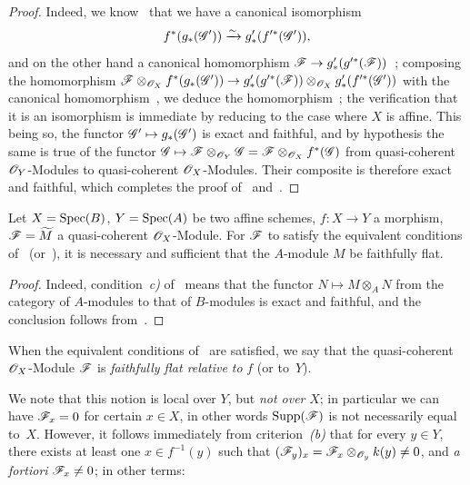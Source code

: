 \begin{proof}
Indeed, we know~ that we have a canonical isomorphism
\[
  f^*(g_*(\mathscr{G}'))\xrightarrow{\sim} g'_*(f'^*(\mathscr{G}')),
\]
and on the other hand a canonical homomorphism $\mathscr{F}\to g'_*(g'^*(\mathscr{F}))$~; composing the homomorphism $\mathscr{F}\otimes_{\mathscr{O}_X}f^*(g_*(\mathscr{G}'))\to g'_*(g'^*(\mathscr{F}))\otimes_{\mathscr{O}_X}g'_*(f'^*(\mathscr{G}'))$ with the canonical homomorphism~, we deduce the homomorphism~; the verification that it is an isomorphism is immediate by reducing to the case where $X$ is affine.
This being so, the functor $\mathscr{G}'\mapsto g_*(\mathscr{G}')$ is exact and faithful, and by hypothesis the same is true of the functor $\mathscr{G}\mapsto\mathscr{F}\otimes_{\mathscr{O}_Y}\mathscr{G}=\mathscr{F}\otimes_{\mathscr{O}_X}f^*(\mathscr{G})$ from quasi-coherent $\mathscr{O}_Y$-Modules to quasi-coherent $\mathscr{O}_X$-Modules.
Their composite is therefore exact and faithful, which completes the proof of~ and~.
\end{proof}

\begin{corollary}[2.2.3]
\label{IV.2.2.3}
Let $X=\operatorname{Spec}(B)$, $Y=\operatorname{Spec}(A)$ be two affine schemes, $f:X\to Y$ a morphism, $\mathscr{F}=\widetilde{M}$ a quasi-coherent $\mathscr{O}_X$-Module.
For $\mathscr{F}$ to satisfy the equivalent conditions of~ \textnormal{(}or~\textnormal{)}, it is necessary and sufficient that the $A$-module $M$ be faithfully flat.
\end{corollary}

\begin{proof}
Indeed, condition~\emph{c)} of~ means that the functor $N\mapsto M\otimes_A N$ from the category of $A$-modules to that of $B$-modules is exact and faithful, and the conclusion follows from~.
\end{proof}

\begin{definition}[2.2.4]
\label{IV.2.2.4}
When the equivalent conditions of~ are satisfied, we say that the quasi-coherent $\mathscr{O}_X$-Module $\mathscr{F}$ is \emph{faithfully flat relative to} $f$ (or to~$Y$).
\end{definition}

We note that this notion is local over $Y$, but \emph{not over} $X$; in particular we can have $\mathscr{F}_x=0$ for certain $x\in X$, in other words $\operatorname{Supp}(\mathscr{F})$ is not necessarily equal to~$X$.
However, it follows immediately from criterion~\emph{(b)} that for every $y\in Y$, there exists at least one $x\in f^{-1}(y)$ such that $(\mathscr{F}_y)_x=\mathscr{F}_x\otimes_{\mathscr{O}_y}k(y)\neq 0$, and \emph{a fortiori} $\mathscr{F}_x\neq 0$; in other terms:

